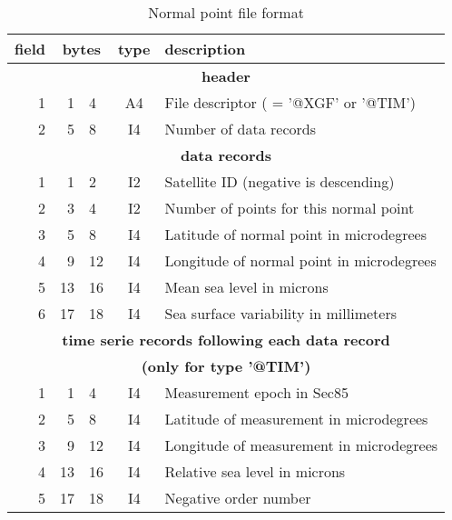 \begin{table}
\caption{Normal point file format}
\medskip
\begin{tabular}{|rr@{--}lc|p{}|}
\hline
field&\multicolumn{2}{c}{bytes}&type&description \\
\hline
\multicolumn{5}{c}{\bf header} \\
\hline
 1 & 1 & 4 & A4 & File descriptor ( = '@XGF' or '@TIM') \\
 2 & 5 & 8 & I4 & Number of data records \\
\hline
\multicolumn{5}{c}{\bf data records} \\
\hline
 1 & 1 & 2 & I2 & Satellite ID (negative is descending) \\
 2 & 3 & 4 & I2 & Number of points for this normal point \\
 3 & 5 & 8 & I4 & Latitude of normal point in microdegrees \\
 4 & 9 &12 & I4 & Longitude of normal point in microdegrees \\
 5 &13 &16 & I4 & Mean sea level in microns \\
 6 &17 &18 & I4 & Sea surface variability in millimeters \\
\hline
\multicolumn{5}{c}{\bf time serie records following each data record}\\
\multicolumn{5}{c}{\bf (only for type '@TIM')} \\
\hline
 1 & 1 & 4 & I4 & Measurement epoch in Sec85 \\
 2 & 5 & 8 & I4 & Latitude of measurement in microdegrees \\
 3 & 9 &12 & I4 & Longitude of measurement in microdegrees \\
 4 &13 &16 & I4 & Relative sea level in microns \\
 5 &17 &18 & I4 & Negative order number \\
\hline
\end{tabular}
\end{table}



